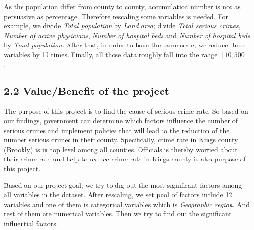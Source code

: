 \documentclass[oneside,11pt]{homework}
\begin{document}
As the population differ from county to county, accumulation number is not as persuasive as percentage. Therefore rescaling some variables is needed. For example, we divide \textit{Total population} by \textit{Land area}; divide \textit{Total serious crimes}, \textit{Number of active physicians}, \textit{Number of hospital beds} and \textit{Number of hospital beds} by \textit{Total population}. After that, in order to have the same scale, we reduce these variables by 10 times. Finally, all those data roughly fall into the range $[10, 500]$.

\subsection*{2.2 Value/Benefit of the project}
The purpose of this project is to find the cause of serious crime rate. So based on our findings, government can determine which factors influence the number of serious crimes and implement policies that will lead to the reduction of the number serious crimes in their county. Specifically, crime rate in Kings county (Brookly) is in top level among all counties. Officials is thereby worried about their crime rate and help to reduce crime rate in Kings county is also purpose of this project.\par
Based on our project goal, we try to dig out the most significant factors among all variables in the dataset. After rescaling, we set pool of factors include 12 variables and one of them is categorical variables which is \textit{Geographic region}. And rest of them are numerical variables. Then we try to find out the significant influential factors.
\end{document}
